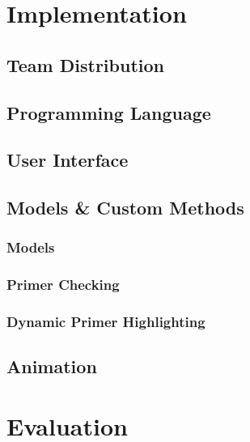\documentclass{l3proj}
\begin{document}
\chapter{Implementation}
\label{chap:impl}

\section{Team Distribution}
\label{impl:teamdistribution}


\section{Programming Language}
\label{impl:proglang}


\section{User Interface}
\label{impl:ui}


\section{Models \& Custom Methods}
\label{impl:models}

\subsection{Models}


\subsection{Primer Checking}


\subsection{Dynamic Primer Highlighting}
\label{impl:models:dynHigh}


\section{Animation}
\label{impl:anim}


\chapter{Evaluation}
\label{eval}
\end{document}
